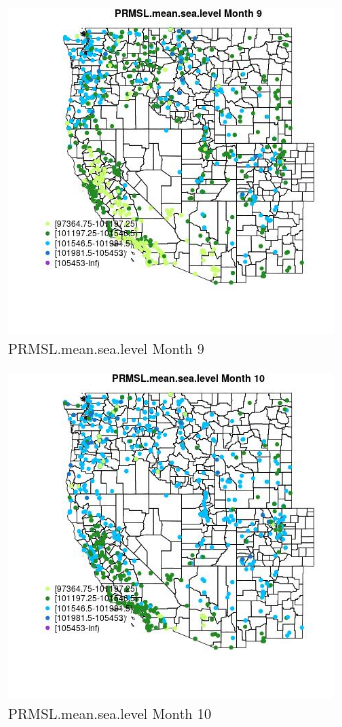 \begin{figure} 
\centering  
\includegraphics[width=0.77\textwidth]{Code_Outputs/Report_ML_input_PM25_Step4_part_e_de_duplicated_aves_compiled_2019-05-21wNAs_MapObsMo9PRMSLmeansealevel.jpg} 
\caption{\label{fig:Report_ML_input_PM25_Step4_part_e_de_duplicated_aves_compiled_2019-05-21wNAsMapObsMo9PRMSLmeansealevel}PRMSL.mean.sea.level Month 9} 
\end{figure} 
 

\begin{figure} 
\centering  
\includegraphics[width=0.77\textwidth]{Code_Outputs/Report_ML_input_PM25_Step4_part_e_de_duplicated_aves_compiled_2019-05-21wNAs_MapObsMo10PRMSLmeansealevel.jpg} 
\caption{\label{fig:Report_ML_input_PM25_Step4_part_e_de_duplicated_aves_compiled_2019-05-21wNAsMapObsMo10PRMSLmeansealevel}PRMSL.mean.sea.level Month 10} 
\end{figure} 
 

